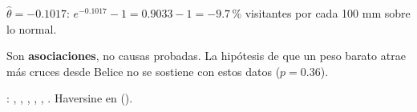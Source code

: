 \begin{amano}
$\hat\theta=-0.1017$: $e^{-0.1017}-1=0.9033-1=-9.7\,\%$ visitantes por cada 100 mm sobre lo normal.
\end{amano}

Son \textbf{asociaciones}, no causas probadas. La hipótesis de que un peso barato atrae más cruces desde Belice no se
sostiene con estos datos ($p=0.36$).

\begin{codigoen}: , ,
, , , . Haversine en
 ().\end{codigoen}
